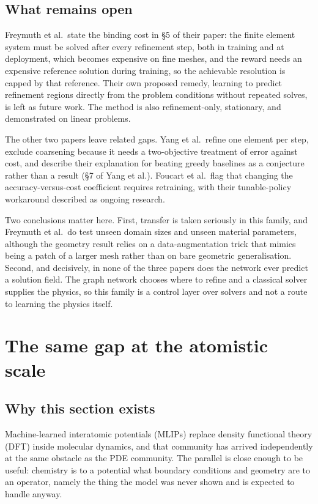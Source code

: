\documentclass[11pt, a4paper]{article}
\begin{document}
\subsection{What remains open}

Freymuth et al.\ state the binding cost in \S{}5 of their paper: the finite
element system must be solved after every refinement step, both in training
and at deployment, which becomes expensive on fine meshes, and the reward
needs an expensive reference solution during training, so the achievable
resolution is capped by that reference. Their own proposed remedy, learning
to predict refinement regions directly from the problem conditions without
repeated solves, is left as future work. The method is also refinement-only,
stationary, and demonstrated on linear problems.

The other two papers leave related gaps. Yang et al.\ refine one element per
step, exclude coarsening because it needs a two-objective treatment of error
against cost, and describe their explanation for beating greedy baselines as
a conjecture rather than a result (\S{}7 of Yang et al.). Foucart et al.\ flag
that changing the accuracy-versus-cost coefficient requires retraining, with
their tunable-policy workaround described as ongoing research.

Two conclusions matter here. First, transfer is taken seriously in this
family, and Freymuth et al.\ do test unseen domain sizes and unseen material
parameters, although the geometry result relies on a data-augmentation trick
that mimics being a patch of a larger mesh rather than on bare geometric
generalisation. Second, and decisively, in none of the three papers does the
network ever predict a solution field. The graph network chooses where to
refine and a classical solver supplies the physics, so this family is a
control layer over solvers and not a route to learning the physics itself.

\section{The same gap at the atomistic scale}
\label{sec:atomistic}

\subsection{Why this section exists}

Machine-learned interatomic potentials (MLIPs) replace density functional
theory (DFT) inside molecular dynamics, and that community has arrived independently at
the same obstacle as the PDE community. The parallel is close enough to be
useful: chemistry is to a potential what boundary conditions and geometry are
to an operator, namely the thing the model was never shown and is expected to
handle anyway.
\end{document}
